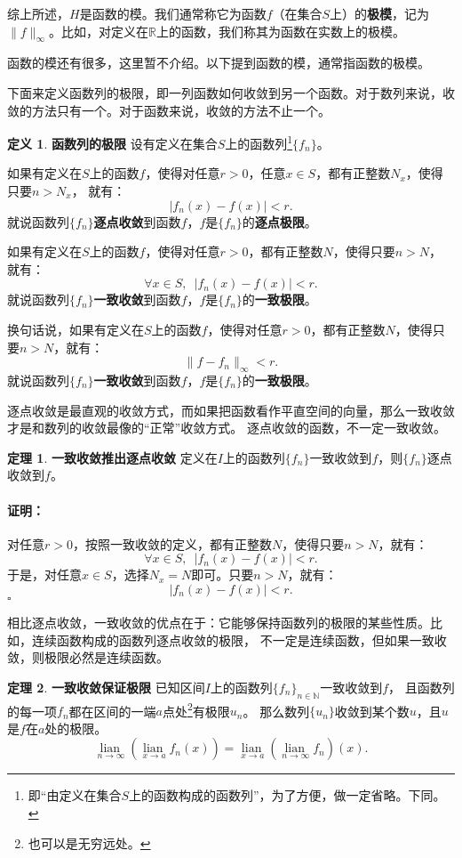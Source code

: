 \documentclass[12pt,UTF8]{ctexbook}
\newcommand{\lian}[1]{
    \underset{#1}{\operatorname{lian}\,}
}
\theoremstyle{definition}
\newtheorem{df}{定义}[section]
\newtheorem{tm}{定理}[section]
\theoremstyle{plain}
\renewenvironment{proof}{\paragraph{\textbf{证明：}}}{\hfill$\square$}
\begin{document}
\begin{appendix}
综上所述，$H$是函数的模。我们通常称它为函数$f$（在集合$S$上）的\textbf{极模}，记为$\|f\|_{\infty}$。比如，对定义在$\mathbb{R}$上的函数，我们称其为函数在实数上的极模。

函数的模还有很多，这里暂不介绍。以下提到函数的模，通常指函数的极模。

下面来定义函数列的极限，即一列函数如何收敛到另一个函数。对于数列来说，收敛的方法只有一个。对于函数来说，收敛的方法不止一个。

\begin{df}{\textbf{函数列的极限}}
    设有定义在集合$S$上的函数列\footnote{即“由定义在集合$S$上的函数构成的函数列”，为了方便，做一定省略。下同。}$\{f_n\}$。
    
    如果有定义在$S$上的函数$f$，使得对任意$r>0$，任意$x\in S$，都有正整数$N_x$，使得只要$n>N_x$，
    就有：
    $$ |f_n(x) - f(x) | < r.$$
    就说函数列$\{f_n\}$\textbf{逐点收敛}到函数$f$，$f$是$\{f_n\}$的\textbf{逐点极限}。

    如果有定义在$S$上的函数$f$，使得对任意$r>0$，都有正整数$N$，使得只要$n>N$，
    就有：
    $$ \forall x\in S, \,\,\,|f_n(x) - f(x) | < r.$$
    就说函数列$\{f_n\}$\textbf{一致收敛}到函数$f$，$f$是$\{f_n\}$的\textbf{一致极限}。

    换句话说，如果有定义在$S$上的函数$f$，使得对任意$r>0$，都有正整数$N$，使得只要$n>N$，就有：
    $$ \| f - f_n \|_{\infty} < r.$$
    就说函数列$\{f_n\}$\textbf{一致收敛}到函数$f$，$f$是$\{f_n\}$的\textbf{一致极限}。
\end{df}

逐点收敛是最直观的收敛方式，而如果把函数看作平直空间的向量，那么一致收敛才是和数列的收敛最像的“正常”收敛方式。
逐点收敛的函数，不一定一致收敛。

\begin{tm}{\textbf{一致收敛推出逐点收敛}}
    定义在$I$上的函数列$\{f_n\}$一致收敛到$f$，则$\{f_n\}$逐点收敛到$f$。
\end{tm}

\begin{proof}
    对任意$r>0$，按照一致收敛的定义，都有正整数$N$，使得只要$n>N$，就有：
    $$ \forall x\in S, \,\,\,|f_n(x) - f(x) | < r.$$
    于是，对任意$x\in S$，选择$N_x = N$即可。只要$n>N$，就有：
    $$ |f_n(x) - f(x) | < r.$$
\end{proof}

相比逐点收敛，一致收敛的优点在于：它能够保持函数列的极限的某些性质。比如，连续函数构成的函数列逐点收敛的极限，
不一定是连续函数，但如果一致收敛，则极限必然是连续函数。

\begin{tm}{\textbf{一致收敛保证极限}}
    已知区间$I$上的函数列$\{f_n\}_{n\in\mathbb{N}}$一致收敛到$f$，
    且函数列的每一项$f_n$都在区间的一端$a$点处\footnote{也可以是无穷远处。}有极限$u_n$。
    那么数列$\{u_n\}$收敛到某个数$u$，且$u$是$f$在$a$处的极限。
    $$ \lian{n\to \infty} \left(\lian{x\to a} f_n(x) \right) = \lian{x\to a} \left(\lian{n\to \infty} f_n\right)(x). $$
\end{tm}


\end{appendix}
\end{document}
